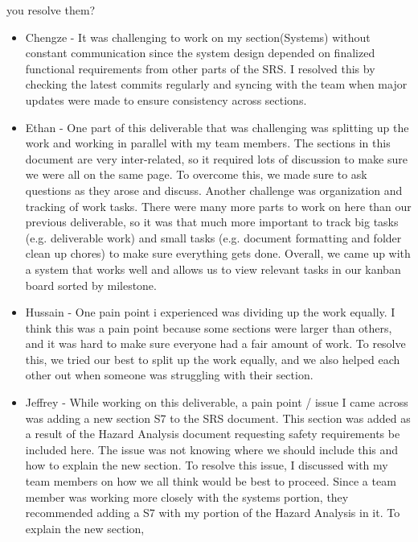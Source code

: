 \begin{enumerate}
  you resolve them?
  \begin{itemize}
        \item Chengze - It was challenging to work on my section(Systems) without 
        constant communication since the system design depended on finalized 
        functional requirements from other parts of the SRS. I resolved this 
        by checking the latest commits regularly and syncing with the team when 
        major updates were made to ensure consistency across sections.
        \item Ethan - One part of this deliverable that was challenging was
          splitting up the work and working in parallel with my team members.
          The sections in this document are very inter-related, so it required
          lots of discussion to make sure we were all on the same page. To
          overcome this, we made sure to ask questions as they arose and
          discuss. Another challenge was organization and tracking of work
          tasks. There were many more parts to work on here than our previous
          deliverable, so it was that much more important to track big tasks
          (e.g. deliverable work) and small tasks (e.g. document formatting and
          folder clean up chores) to make sure everything gets done. Overall,
          we came up with a system that works well and allows us to view
          relevant tasks in our kanban board sorted by milestone.
        \item Hussain - One pain point i experienced was dividing up the work
            equally. I think this was a pain point because some sections were
            larger than others, and it was hard to make sure everyone had a fair
            amount of work. To resolve this, we tried our best to split up the
            work equally, and we also helped each other out when someone was
            struggling with their section.
        \item Jeffrey - While working on this deliverable, a pain point / issue
        I came across was adding a new section S7 to the SRS document. This
        section was added as a result of the Hazard Analysis document requesting
        safety requirements be included here. The issue was not knowing
        where we should include this and how to explain the new section.
        To resolve this issue, I discussed with my team members on how we all
        think would be best to proceed. Since a team member was working more 
        closely with the systems portion, they recommended adding a S7 with my
        portion of the Hazard Analysis in it. To explain the new section,

\end{itemize}
\end{enumerate}
